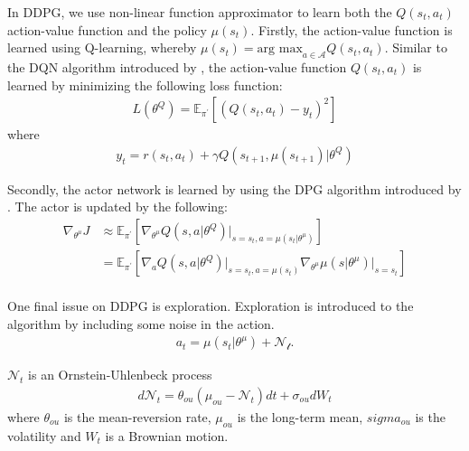 \documentclass[12pt,twoside]{article}
\begin{document}
In DDPG, we use non-linear function approximator to learn both the $Q(s_t, a_t)$ action-value function and the policy $\mu(s_t)$.  Firstly, the action-value function is learned using Q-learning, whereby $\mu(s_t) = \text{arg max}_{a\in \mathcal{A}} Q(s_t,a_t)$. Similar to the DQN algorithm introduced by \cite{mnih2015human}, the action-value function $Q(s_t, a_t)$ is learned by minimizing the following loss function:
\begin{align*}
	L(\theta^Q) = \mathbb{E}_{\pi^\prime}\left[(Q(s_t,a_t)-y_t)^2\right]
\end{align*}
where
\begin{align*}
	y_t = r(s_t,a_t) + \gamma Q(s_{t+1}, \mu(s_{t+1})\vert \theta^Q)
\end{align*}

Secondly, the actor network is learned by using the DPG algorithm introduced by \cite{silver2014deterministic}. The actor is updated by the following:
\begin{align*}
	\nabla_{\theta^\mu} J & \approx \mathbb{E}_{\pi^\prime}\left[\nabla_{\theta^\mu}Q(s,a\vert \theta^Q)\vert_{s=s_t, a=\mu(s_t\vert\theta^\mu)}\right]\\
	& = \mathbb{E}_{\pi^\prime}\left[\nabla_a Q(s,a\vert \theta^Q)\vert_{s=s_t, a=\mu(s_t)}\nabla_{\theta^\mu} \mu(s\vert \theta^\mu)\vert_{s=s_t}\right]\\
\end{align*}

One final issue on DDPG is exploration. Exploration is introduced to the algorithm by including some noise in the action.
\begin{align*}
	a_t = \mu(s_t\vert \theta^\mu) + \mathcal{N_t}.
\end{align*}

$\mathcal{N}_t $ is an Ornstein-Uhlenbeck process
\begin{align*}
	d\mathcal{N}_t = \theta_{ou}(\mu_{ou} - \mathcal{N}_t)dt + \sigma_{ou} dW_t
\end{align*}
where
$\theta_{ou}$ is the mean-reversion rate, $\mu_{ou}$ is the long-term mean, $sigma_{ou}$ is the volatility and  $W_t$ is a Brownian motion.


\newpage
\end{document}
